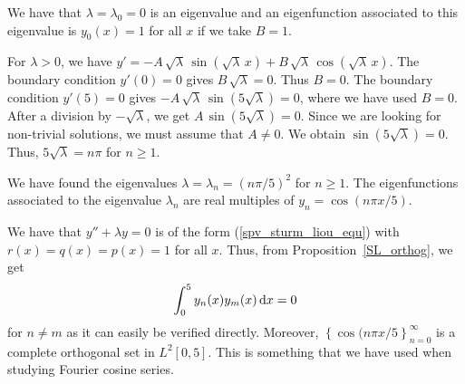 \begin{egg}
We have that $\lambda = \lambda_0 = 0$ is an eigenvalue and an
eigenfunction associated to this eigenvalue is $y_0(x)=1$ for all $x$
if we take $B=1$.

 For $\lambda > 0$, we have
$\displaystyle y' = -A\,\sqrt{\lambda}\, \sin\left(\sqrt{\lambda}\,x\right) +
B\, \sqrt{\lambda}\, \cos\left(\sqrt{\lambda}\,x\right)$.
The boundary condition $y'(0)=0$ gives
$B\, \sqrt{\lambda} = 0$.  Thus $B=0$.  The boundary condition
$y'(5) = 0$ gives
$\displaystyle -A\,\sqrt{\lambda}\,\sin\left(5\sqrt{\lambda}\right)=0$,
where we have used $B=0$.  After a division by $-\sqrt{\lambda}$, we
get $\displaystyle A\, \sin\left( 5\sqrt{\lambda}\right) =0$.
Since we are looking for non-trivial solutions, we must assume that
$A\neq 0$.  We obtain
$\displaystyle \sin\left( 5\sqrt{\lambda}\right) = 0$.  Thus,
$\displaystyle 5\sqrt{\lambda} = n\pi$ for $n \geq 1$.

We have found the eigenvalues
$\displaystyle \lambda = \lambda_n = \left(n\pi / 5\right)^2$
for $n \geq 1$.  The eigenfunctions associated to the 
eigenvalue $\lambda_n$ are real multiples of
$\displaystyle y_n = \cos\left( n\pi x / 5 \right)$.

We have that $y''+ \lambda y = 0$ is of the form
(\ref{spv_sturm_liou_equ}) with $r(x) = q(x) = p(x) = 1$ for all $x$.
Thus, from Proposition~\ref{SL_orthog}, we get
\[
\int_0^5 y_n(x) y_m(x) \,\mathrm{d}{x} = 0
\]
for $n \neq m$ as it can easily be verified directly.  Moreover,
$\displaystyle \left\{ \cos(n\pi x/5\right\}_{n=0}^\infty$ is a
complete orthogonal set in $\displaystyle L^2[0,5]$.  This is something that we
have used when studying Fourier cosine series.
\end{egg}

